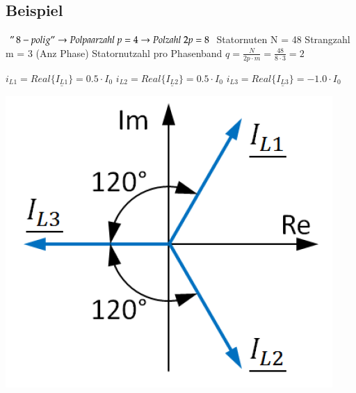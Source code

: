 \subsection{Beispiel}
    \begin{minipage}{0.5\linewidth}	
        $ "\,8-polig "  \rightarrow  Polpaarzahl \; p = 4   \rightarrow  Polzahl \;2p = 8$\newline
        Statornuten N = 48  \newline
        Strangzahl m = 3 (Anz Phase)\newline
        Statornutzahl pro Phasenband $q = \frac{N}{2p \cdot m}= \frac{48}{8 \cdot 3}=2 $\newline
    \end{minipage}
    \begin{minipage}{0.3\linewidth}
        $i_{L1} = Real\{\underline{I_{L1}}\} = 0.5\cdot I_0$ \newline \newline
        $i_{L2} = Real\{\underline{I_{L2}}\} = 0.5\cdot I_0$ \newline \newline
        $i_{L3} = Real\{\underline{I_{L3}}\} = -1.0\cdot I_0$ 
    \end{minipage}
    \begin{minipage}{0.3\linewidth}
    \includegraphics[scale = 0.3]{images/StromdreieckAGS}
\end{minipage}
\vspace{-1cm}
